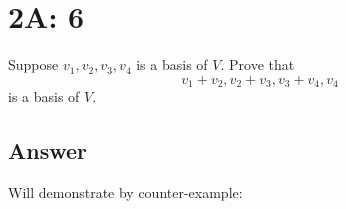 \documentclass[
	12pt, %
]{fphw}
\begin{document}
\section*{2A: 6}

\begin{problem}
Suppose $v_1, v_2, v_3, v_4$ is a basis of $V$. Prove that
$$
v_1 + v_2, v_2 + v_3, v_3 + v_4, v_4
$$
is a basis of $V$.
\end{problem}


\subsection*{Answer} Will demonstrate by counter-example:\\


\end{document}
